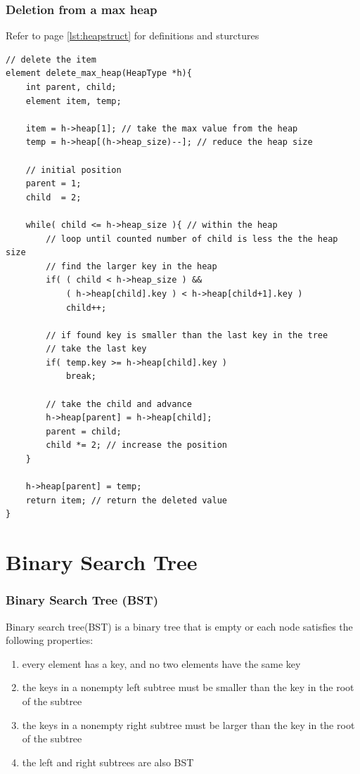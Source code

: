 \documentclass[newPxFont,sthlmFooter,nooffset]{beamer}
\begin{document}
\begin{frame}
  \frametitle{Deletion from a max heap}

Refer to page \ref{lst:heapstruct} for definitions and sturctures
  \begin{lstlisting}
// delete the item
element delete_max_heap(HeapType *h){
    int parent, child;
    element item, temp;

    item = h->heap[1]; // take the max value from the heap
    temp = h->heap[(h->heap_size)--]; // reduce the heap size

    // initial position
    parent = 1;
    child  = 2;

    while( child <= h->heap_size ){ // within the heap
        // loop until counted number of child is less the the heap size
        // find the larger key in the heap
        if( ( child < h->heap_size ) &&
            ( h->heap[child].key ) < h->heap[child+1].key )
            child++;

        // if found key is smaller than the last key in the tree 
        // take the last key
        if( temp.key >= h->heap[child].key )
            break;

        // take the child and advance
        h->heap[parent] = h->heap[child];
        parent = child;
        child *= 2; // increase the position
    }

    h->heap[parent] = temp;
    return item; // return the deleted value
}    
  \end{lstlisting}
\end{frame}

\section{Binary Search Tree}
\begin{frame}[t]
  \frametitle{Binary Search Tree (BST)}
Binary search tree(BST) is a binary tree that is empty or each
node satisfies the following properties:
\begin{enumerate}
\item every element has a key, and no two elements have the same key
\item the keys in a nonempty left subtree must be smaller than the key
  in the root of the subtree
\item the keys in a nonempty right subtree
  must be larger than the key in the root of the subtree
\item the left and right subtrees are also BST
\end{enumerate}

\end{frame}
\end{document}
